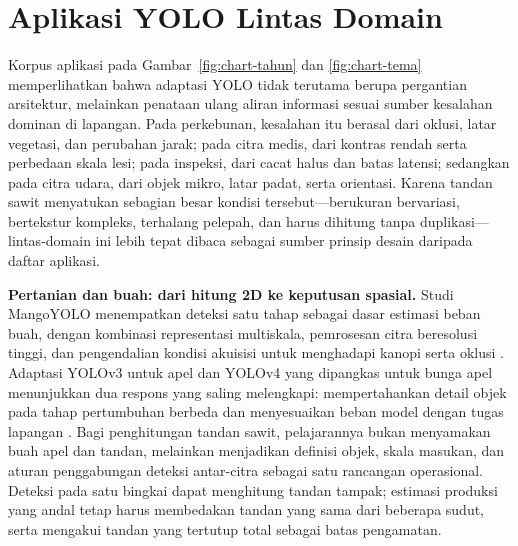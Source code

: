 
\section{Aplikasi YOLO Lintas Domain}\label{sec:aplikasi}
Korpus aplikasi pada Gambar~\ref{fig:chart-tahun} dan
\ref{fig:chart-tema} memperlihatkan bahwa adaptasi YOLO tidak terutama
berupa pergantian arsitektur, melainkan penataan ulang aliran informasi
sesuai sumber kesalahan dominan di lapangan. Pada perkebunan, kesalahan
itu berasal dari oklusi, latar vegetasi, dan perubahan jarak; pada citra
medis, dari kontras rendah serta perbedaan skala lesi; pada inspeksi,
dari cacat halus dan batas latensi; sedangkan pada citra udara, dari objek
mikro, latar padat, serta orientasi. Karena tandan sawit menyatukan sebagian
besar kondisi tersebut---berukuran bervariasi, bertekstur kompleks,
terhalang pelepah, dan harus dihitung tanpa duplikasi---lintas-domain ini
lebih tepat dibaca sebagai sumber prinsip desain daripada daftar aplikasi.

\textbf{Pertanian dan buah: dari hitung 2D ke keputusan spasial.} Studi
MangoYOLO menempatkan deteksi satu tahap sebagai dasar estimasi beban buah,
dengan kombinasi representasi multiskala, pemrosesan citra beresolusi tinggi,
dan pengendalian kondisi akuisisi untuk menghadapi kanopi serta oklusi
\cite{koirala2019deepfruit}. Adaptasi YOLOv3 untuk apel dan YOLOv4 yang
dipangkas untuk bunga apel menunjukkan dua respons yang saling melengkapi:
mempertahankan detail objek pada tahap pertumbuhan berbeda dan menyesuaikan
beban model dengan tugas lapangan \cite{tian2019appleyolo,wu2020flower}.
Bagi penghitungan tandan sawit, pelajarannya bukan menyamakan buah apel dan
tandan, melainkan menjadikan definisi objek, skala masukan, dan aturan
penggabungan deteksi antar-citra sebagai satu rancangan operasional. Deteksi
pada satu bingkai dapat menghitung tandan tampak; estimasi produksi yang
andal tetap harus membedakan tandan yang sama dari beberapa sudut, serta
mengakui tandan yang tertutup total sebagai batas pengamatan.

